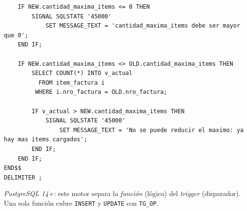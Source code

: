 \documentclass[11pt,a4paper]{article}
\begin{document}
\begin{lstlisting}
    IF NEW.cantidad_maxima_items <= 0 THEN
        SIGNAL SQLSTATE '45000'
            SET MESSAGE_TEXT = 'cantidad_maxima_items debe ser mayor que 0';
    END IF;

    IF NEW.cantidad_maxima_items <> OLD.cantidad_maxima_items THEN
        SELECT COUNT(*) INTO v_actual
          FROM item_factura i
         WHERE i.nro_factura = OLD.nro_factura;

        IF v_actual > NEW.cantidad_maxima_items THEN
            SIGNAL SQLSTATE '45000'
                SET MESSAGE_TEXT = 'No se puede reducir el maximo: ya hay mas items cargados';
        END IF;
    END IF;
END$$
DELIMITER ;
\end{lstlisting}

\textit{PostgreSQL 14+:} este motor separa la \emph{función} (lógica) del \emph{trigger} (disparador). Una sola función cubre \texttt{INSERT} y \texttt{UPDATE} con \texttt{TG\_OP}.
\end{document}
